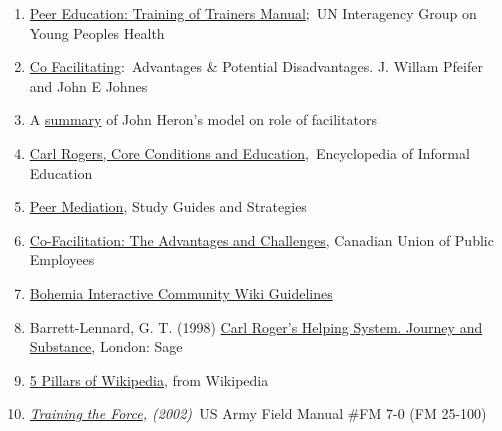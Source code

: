 \begin{enumerate}
\item
  \href{http://www.scribd.com/doc/54544925/51/TRAINING-TOPIC-Co-facilitation-skills}{Peer
  Education: Training of Trainers Manual};~UN Interagency Group on Young
  Peoples Health
\item
  \href{http://www.breakoutofthebox.com/Co-FacilitatingPfeifferJones.pdf}{Co
  Facilitating}:~Advantages \& Potential Disadvantages. J. Willam
  Pfeifer and John E Johnes
\item
  A
  \href{http://reviewing.co.uk/archives/art/13\_1\_what\_do\_facilitators\_do.htm\#8\_WAYS\_OF\_FACILITATING\_ACTIVE\_LEARNING}{summary}
  of John Heron's model on role of facilitators
\item
  \href{http://www.infed.org/thinkers/et-rogers.htm}{C}\href{http://www.infed.org/thinkers/et-rogers.htm}{arl
  Rogers, Core Conditions and Education},~Encyclopedia of Informal
  Education
\item
  \href{http://www.studygs.net/peermed.htm}{Peer Mediation}, Study
  Guides and Strategies
\item
  \href{http://sk.cupe.ca/updir/cofacilitation-handouts.doc}{Co-Facilitation:
  The Advantages and Challenges}, Canadian Union of Public Employees
\item
  \href{http://community.bistudio.com/wiki/Bohemia\_Interactive\_Community:Guidelines}{Bohemia
  Interactive Community Wiki Guidelines}
\item
  Barrett-Lennard, G. T. (1998)
  \href{http://openlibrary.org/works/OL2014352W/Carl\_Rogers'\_Helping\_System}{Carl
  Roger's Helping System. Journey and Substance}, London: Sage
\item
  \href{http://en.wikipedia.org/w/index.php?title=Wikipedia:Five\_pillars\&oldid=501472166}{5
  Pillars of Wikipedia}, from Wikipedia
\item
  \emph{\href{http://www.africom.mil/WO-NCO/DownloadCenter/\%5C40Publications/Training\%20the\%20Force\%20Manual.pdf}{Training
  the Force}, (2002)~}US Army Field Manual \#FM 7-0 (FM 25-100)
\end{enumerate}
